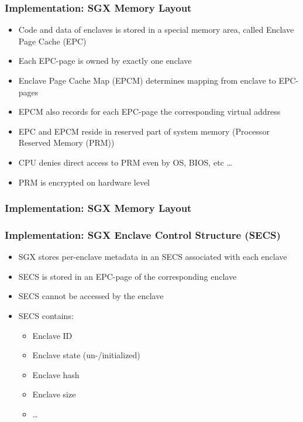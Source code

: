 \begin{frame}
    \frametitle{Implementation: SGX Memory Layout}
    \begin{itemize}[<+->]
        \item Code and data of enclaves is stored in a special memory area, called Enclave Page Cache (EPC)
        \item Each EPC-page is owned by exactly one enclave
        \item Enclave Page Cache Map (EPCM) determines mapping from enclave to EPC-pages
        \item EPCM also records for each EPC-page the corresponding virtual address
        \item EPC and EPCM reside in reserved part of system memory (Processor Reserved Memory (PRM))
        \item CPU denies direct access to PRM even by OS, BIOS, etc \dots
        \item PRM is encrypted on hardware level
    \end{itemize}
\end{frame}

\begin{frame}
    \frametitle{Implementation: SGX Memory Layout}
    \centering
\end{frame}

\begin{frame}
    \frametitle{Implementation: SGX Enclave Control Structure (SECS)}
    \begin{itemize}[<+->]
        \item SGX stores per-enclave metadata in an SECS associated with each enclave
        \item SECS is stored in an EPC-page of the corresponding enclave
        \item SECS cannot be accessed by the enclave
        \item SECS contains:
        \begin{itemize}
            \item Enclave ID
            \item Enclave state (un-/initialized)
            \item Enclave hash
            \item Enclave size
            \item \dots
        \end{itemize}
    \end{itemize}
    

\end{frame}

